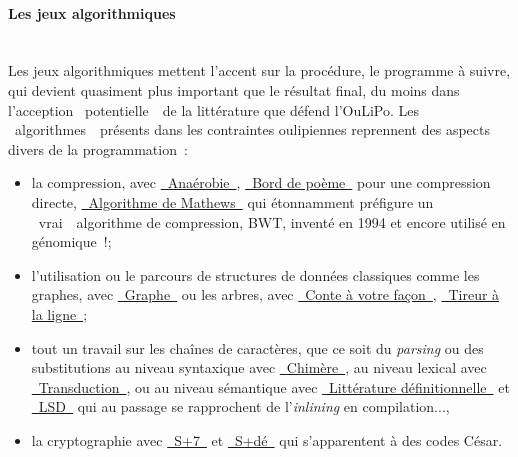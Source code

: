 \documentclass{article}
\newcommand{\subsubsubsection}[1]{\paragraph{#1}\mbox{}\\}
\begin{document}
				\subsubsubsection{Les jeux algorithmiques}
					Les jeux algorithmiques mettent l'accent sur la procédure, le programme à suivre, qui devient quasiment plus important que le résultat final, du moins dans l'acception \guillemotleft~potentielle~\guillemotright~de la littérature que défend l'OuLiPo. Les \guillemotleft~algorithmes~\guillemotright~présents dans les contraintes oulipiennes reprennent des aspects divers de la programmation~:
					\vspace{2mm}
					\begin{itemize}
						\item la compression, avec \href{http://oulipo.net/fr/contraintes/anaerobie}{\guillemotleft~Anaérobie~\guillemotright}, \href{http://oulipo.net/fr/contraintes/bord-de-poeme}{\guillemotleft~Bord de poème~\guillemotright} pour une compression directe, \href{http://oulipo.net/fr/contraintes/algorithme-de-mathews}{\guillemotleft~Algorithme de Mathews~\guillemotright} qui étonnamment préfigure un \guillemotleft~vrai~\guillemotright~algorithme de compression, BWT, inventé en 1994 et encore utilisé en génomique~!;
						\item l'utilisation ou le parcours de structures de données classiques comme les graphes, avec \href{http://oulipo.net/fr/contraintes/graphe}{\guillemotleft~Graphe~\guillemotright} ou les arbres, avec \href{http://oulipo.net/fr/contraintes/conte-a-votre-facon}{\guillemotleft~Conte à votre façon~\guillemotright}, \href{http://oulipo.net/fr/contraintes/tireur-a-la-ligne}{\guillemotleft~Tireur à la ligne~\guillemotright};
						\item tout un travail sur les chaînes de caractères, que ce soit du \textit{parsing} ou des substitutions au niveau syntaxique avec \href{http://oulipo.net/fr/contraintes/chimere}{\guillemotleft~Chimère~\guillemotright}, au niveau lexical avec \href{http://oulipo.net/fr/contraintes/transduction}{\guillemotleft~Transduction~\guillemotright}, ou au niveau sémantique avec \href{http://oulipo.net/fr/contraintes/litterature-definitionnelle}{\guillemotleft~Littérature définitionnelle~\guillemotright} et \href{http://oulipo.net/fr/contraintes/lsd}{\guillemotleft~LSD~\guillemotright} qui au passage se rapprochent de l'\textit{inlining} en compilation...,
						\item la cryptographie avec \href{http://oulipo.net/fr/contraintes/s7}{\guillemotleft~S+7~\guillemotright} et \href{http://oulipo.net/fr/contraintes/sde}{\guillemotleft~S+dé~\guillemotright} qui s'apparentent à des codes César.
					\end{itemize}
\end{document}
